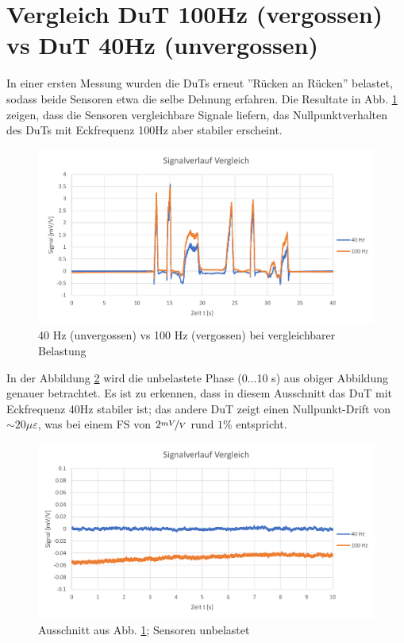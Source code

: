 
\section{Vergleich DuT 100Hz (vergossen) vs DuT 40Hz (unvergossen)}
\noindent
In einer ersten Messung wurden die DuTs erneut ''Rücken an Rücken'' belastet, sodass beide Sensoren etwa die selbe Dehnung erfahren. Die Resultate in Abb. \ref{fig:daten001} zeigen, dass die Sensoren vergleichbare Signale liefern, das Nullpunktverhalten des DuTs mit Eckfrequenz 100Hz aber stabiler erscheint.
\begin{figure}[H]
	\centering
	\includegraphics[width=1\linewidth]{imgs/daten_001}
	\caption{40 Hz (unvergossen) vs 100 Hz (vergossen) bei vergleichbarer Belastung}
	\label{fig:daten001}
\end{figure}
\noindent
In der Abbildung \ref{fig:daten001_NP} wird die unbelastete Phase (0...10 s) aus obiger Abbildung genauer betrachtet. Es ist zu erkennen, dass in diesem Ausschnitt das DuT mit Eckfrequenz 40Hz stabiler ist; das andere DuT zeigt einen Nullpunkt-Drift von $\sim 20\mu\varepsilon$, was bei einem FS von $2\nicefrac{mV}{V}$ rund $ 1\%$ entspricht. 
\begin{figure}[H]
	\centering
	\includegraphics[width=1\linewidth]{imgs/daten_001_NP}
	\caption{Ausschnitt aus Abb. \ref{fig:daten001}; Sensoren unbelastet}
	\label{fig:daten001_NP}
\end{figure}\noindent
